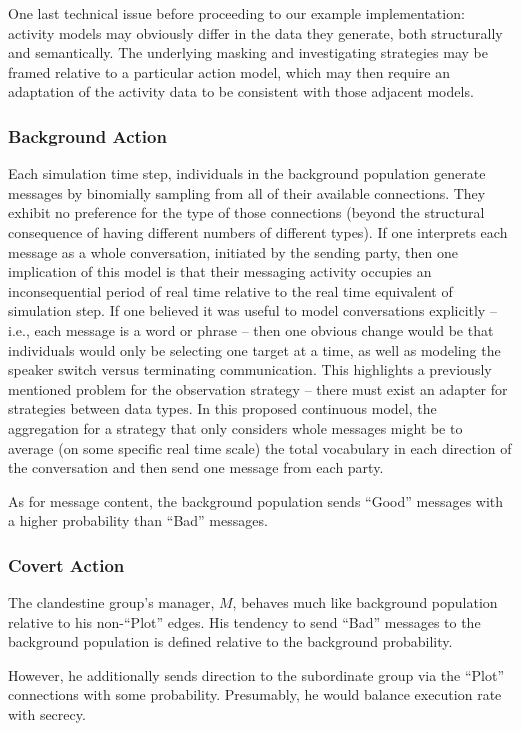 \documentclass{article}
\begin{document}
One last technical issue before proceeding to our example implementation: activity models may obviously differ in the data they generate, both structurally and semantically.  The underlying masking and investigating strategies may be framed relative to a particular action model, which may then require an adaptation of the activity data to be consistent with those adjacent models.

\subsubsection*{Background Action}
Each simulation time step, individuals in the background population generate messages by binomially sampling from all of their available connections.  They exhibit no preference for the type of those connections (beyond the structural consequence of having different numbers of different types).  If one interprets each message as a whole conversation, initiated by the sending party, then one implication of this model is that their messaging activity occupies an inconsequential period of real time relative to the real time equivalent of simulation step.  If one believed it was useful to model conversations explicitly -- i.e., each message is a word or phrase -- then one obvious change would be that individuals would only be selecting one target at a time, as well as modeling the speaker switch versus terminating communication.  This highlights a previously mentioned problem for the observation strategy -- there must exist an adapter for strategies between data types.  In this proposed continuous model, the aggregation for a strategy that only considers whole messages might be to average (on some specific real time scale) the total vocabulary in each direction of the conversation and then send one message from each party.

As for message content, the background population sends ``Good'' messages with a higher probability than ``Bad'' messages.

\subsubsection*{Covert Action}
The clandestine group's manager, $M$, behaves much like background population relative to his non-``Plot'' edges.  His tendency to send ``Bad'' messages to the background population is defined relative to the background probability.

However, he additionally sends direction to the subordinate group via the ``Plot'' connections with some probability.  Presumably, he would balance execution rate with secrecy.
\end{document}

